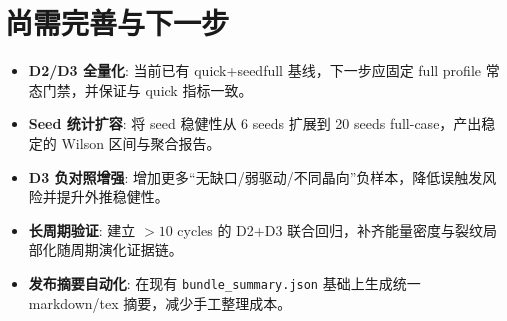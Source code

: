 \documentclass[11pt]{article}
\begin{document}
\section{尚需完善与下一步}
\begin{itemize}
    \item \textbf{D2/D3 全量化}: 当前已有 quick+seedfull 基线，下一步应固定 full profile 常态门禁，并保证与 quick 指标一致。
    \item \textbf{Seed 统计扩容}: 将 seed 稳健性从 6 seeds 扩展到 20 seeds full-case，产出稳定的 Wilson 区间与聚合报告。
    \item \textbf{D3 负对照增强}: 增加更多“无缺口/弱驱动/不同晶向”负样本，降低误触发风险并提升外推稳健性。
    \item \textbf{长周期验证}: 建立 \(>10\) cycles 的 D2+D3 联合回归，补齐能量密度与裂纹局部化随周期演化证据链。
    \item \textbf{发布摘要自动化}: 在现有 \texttt{bundle\_summary.json} 基础上生成统一 markdown/tex 摘要，减少手工整理成本。
\end{itemize}
\end{document}
